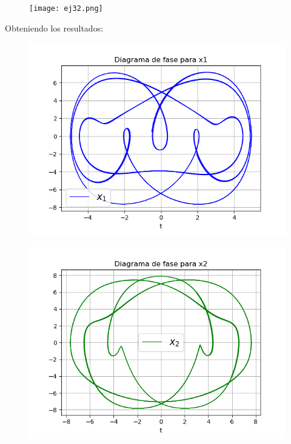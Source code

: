 \documentclass{article}
\begin{document}
\begin{figure}[H]
	\centering
    \texttt{[image: ej32.png]}
\end{figure}
Obteniendo los resultados:\\
\begin{figure}[H]
	\centering
    \includegraphics[width=\linewidth]{32_f1.png}
\end{figure}
\begin{figure}[H]
	\centering
    \includegraphics[width=\linewidth]{32_f2.png}
\end{figure}
\end{document}
